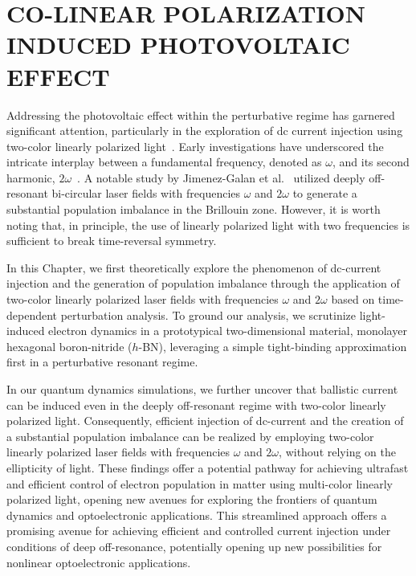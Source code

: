 \chapter{CO-LINEAR POLARIZATION INDUCED PHOTOVOLTAIC EFFECT \label{ch:ch3}} 
Addressing the photovoltaic effect within the perturbative regime has garnered significant attention, particularly in the exploration of dc current injection using two-color linearly polarized light~\cite{PhysRevLett.74.3596,PhysRevLett.76.1703,PhysRevLett.78.306,Sun2010,PhysRevB.100.075202,HeideBoolakeeEcksteinHommelhoff+2021+3701+3707,PhysRevLett.123.067402}. Early investigations have underscored the intricate interplay between a fundamental frequency, denoted as $\omega$, and its second harmonic, $2\omega$~\cite{PhysRevLett.74.3596,PhysRevLett.76.1703,PhysRevLett.78.306}. 
A notable study by Jimenez-Galan et al.~\cite{Jimenez-Galan2020} utilized deeply off-resonant bi-circular laser fields with frequencies $\omega$ and $2\omega$ to generate a substantial population imbalance in the Brillouin zone. However, it is worth noting that, in principle, the use of linearly polarized light with two frequencies is sufficient to break time-reversal symmetry.

In this Chapter, we first theoretically explore the phenomenon of dc-current injection and the generation of population imbalance through the application of two-color linearly polarized laser fields with frequencies $\omega$ and $2\omega$ based on time-dependent perturbation analysis. To ground our analysis, we scrutinize light-induced electron dynamics in a prototypical two-dimensional material, monolayer hexagonal boron-nitride ($h$-BN), leveraging a simple tight-binding approximation first in a perturbative resonant regime.

In our quantum dynamics simulations, we further uncover that ballistic current can be induced even in the deeply off-resonant regime with two-color linearly polarized light.  Consequently, efficient injection of dc-current and the creation of a substantial population imbalance can be realized by employing two-color linearly polarized laser fields with frequencies $\omega$ and $2\omega$, without relying on the ellipticity of light. These findings offer a potential pathway for achieving ultrafast and efficient control of electron population in matter using multi-color linearly polarized light, opening new avenues for exploring the frontiers of quantum dynamics and optoelectronic applications. This streamlined approach offers a promising avenue for achieving efficient and controlled current injection under conditions of deep off-resonance, potentially opening up new possibilities for nonlinear optoelectronic applications.

